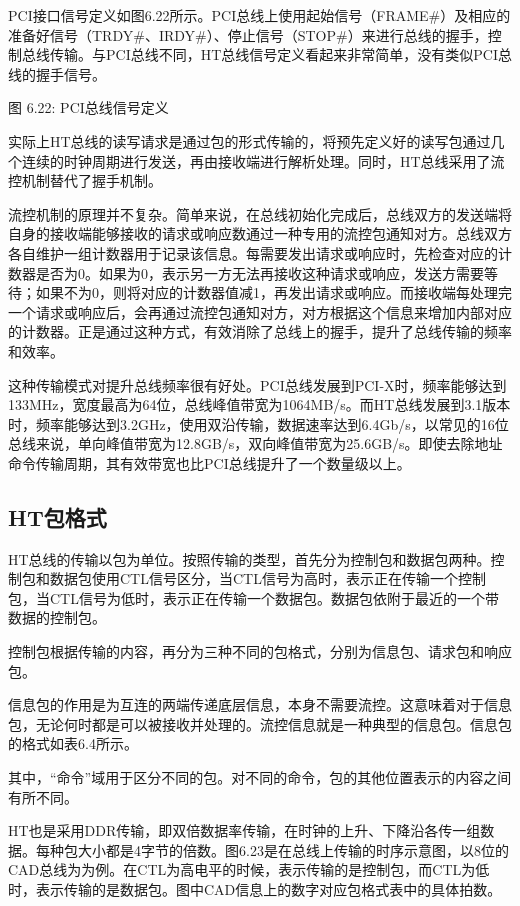 \documentclass[]{ctexbook}
\begin{document}
PCI接口信号定义如图6.22所示。PCI总线上使用起始信号（FRAME\#）及相应的准备好信号（TRDY\#、IRDY\#）、停止信号（STOP\#）来进行总线的握手，控制总线传输。与PCI总线不同，HT总线信号定义看起来非常简单，没有类似PCI总线的握手信号。

图 6.22: PCI总线信号定义

实际上HT总线的读写请求是通过包的形式传输的，将预先定义好的读写包通过几个连续的时钟周期进行发送，再由接收端进行解析处理。同时，HT总线采用了流控机制替代了握手机制。

流控机制的原理并不复杂。简单来说，在总线初始化完成后，总线双方的发送端将自身的接收端能够接收的请求或响应数通过一种专用的流控包通知对方。总线双方各自维护一组计数器用于记录该信息。每需要发出请求或响应时，先检查对应的计数器是否为0。如果为0，表示另一方无法再接收这种请求或响应，发送方需要等待；如果不为0，则将对应的计数器值减1，再发出请求或响应。而接收端每处理完一个请求或响应后，会再通过流控包通知对方，对方根据这个信息来增加内部对应的计数器。正是通过这种方式，有效消除了总线上的握手，提升了总线传输的频率和效率。

这种传输模式对提升总线频率很有好处。PCI总线发展到PCI-X时，频率能够达到133MHz，宽度最高为64位，总线峰值带宽为1064MB/s。而HT总线发展到3.1版本时，频率能够达到3.2GHz，使用双沿传输，数据速率达到6.4Gb/s，以常见的16位总线来说，单向峰值带宽为12.8GB/s，双向峰值带宽为25.6GB/s。即使去除地址命令传输周期，其有效带宽也比PCI总线提升了一个数量级以上。

\hypertarget{htux5305ux683cux5f0f}{%
\subsection{HT包格式}\label{htux5305ux683cux5f0f}}

HT总线的传输以包为单位。按照传输的类型，首先分为控制包和数据包两种。控制包和数据包使用CTL信号区分，当CTL信号为高时，表示正在传输一个控制包，当CTL信号为低时，表示正在传输一个数据包。数据包依附于最近的一个带数据的控制包。

控制包根据传输的内容，再分为三种不同的包格式，分别为信息包、请求包和响应包。

信息包的作用是为互连的两端传递底层信息，本身不需要流控。这意味着对于信息包，无论何时都是可以被接收并处理的。流控信息就是一种典型的信息包。信息包的格式如表6.4所示。

其中，``命令''域用于区分不同的包。对不同的命令，包的其他位置表示的内容之间有所不同。

HT也是采用DDR传输，即双倍数据率传输，在时钟的上升、下降沿各传一组数据。每种包大小都是4字节的倍数。图6.23是在总线上传输的时序示意图，以8位的CAD总线为为例。在CTL为高电平的时候，表示传输的是控制包，而CTL为低时，表示传输的是数据包。图中CAD信息上的数字对应包格式表中的具体拍数。
\end{document}
